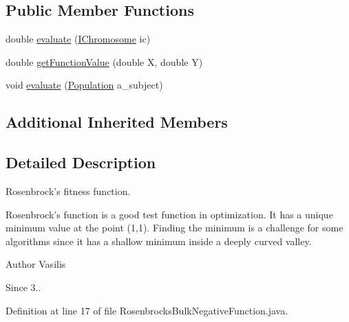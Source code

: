 \subsection*{Public Member Functions}
\begin{DoxyCompactItemize}
\item 
double \hyperlink{classorg_1_1jgap_1_1impl_1_1fitness_1_1_rosenbrocks_bulk_negative_function_a56b2967b6915e293846020e23e2db001}{evaluate} (\hyperlink{interfaceorg_1_1jgap_1_1_i_chromosome}{I\-Chromosome} ic)
\item 
double \hyperlink{classorg_1_1jgap_1_1impl_1_1fitness_1_1_rosenbrocks_bulk_negative_function_a6519c769a5ce4f4f28d06ddc6534185e}{get\-Function\-Value} (double X, double Y)
\item 
void \hyperlink{classorg_1_1jgap_1_1impl_1_1fitness_1_1_rosenbrocks_bulk_negative_function_ad5b5b0c55e81266cf47abbed3069f470}{evaluate} (\hyperlink{classorg_1_1jgap_1_1_population}{Population} a\-\_\-subject)
\end{DoxyCompactItemize}
\subsection*{Additional Inherited Members}


\subsection{Detailed Description}
Rosenbrock's fitness function.

Rosenbrock's function is a good test function in optimization. It has a unique minimum value at the point (1,1). Finding the minimum is a challenge for some algorithms since it has a shallow minimum inside a deeply curved valley.

\begin{DoxyAuthor}{Author}
Vasilis 
\end{DoxyAuthor}
\begin{DoxySince}{Since}
3.. 
\end{DoxySince}


Definition at line 17 of file Rosenbrocks\-Bulk\-Negative\-Function.\-java.



